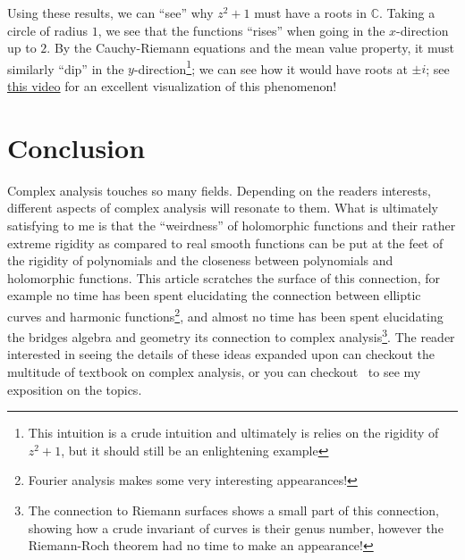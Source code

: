 \documentclass[oneside]{article}
\newcommand{\C}{\mathbb{C}}
\begin{document}
Using these results, we can ``see'' why $z^2+1$ must have a roots in $\C$. Taking a circle of radius
$1$, we see that the functions ``rises'' when going in the $x$-direction up to $2$. By the Cauchy-Riemann
equations and the mean value property, it must similarly ``dip'' in the $y$-direction\footnote{This intuition
  is a crude intuition and ultimately is relies on the rigidity of $z^2+1$, but it should still be an
enlightening example}; we can see how it would have roots at $\pm i$; see
\href{https://www.youtube.com/watch?v=T647CGsuOVU}{this video} for an excellent visualization of this
phenomenon!


\section{Conclusion}

Complex analysis touches so many fields. Depending on the readers interests, different aspects of complex
analysis will resonate to them. What is ultimately satisfying to me is that the ``weirdness'' of holomorphic
functions and their rather extreme rigidity as compared to real smooth functions can be put at the feet of the
rigidity of polynomials and the closeness between polynomials and holomorphic functions. This article
scratches the surface of this connection, for example no time has been spent elucidating the connection
between elliptic curves and harmonic functions\footnote{Fourier analysis makes some very interesting
appearances!}, and almost no time has been spent elucidating the bridges
algebra and geometry its connection to complex analysis\footnote{The connection to Riemann surfaces shows a
  small part of this connection, showing how a crude invariant of curves is their genus number, however the
Riemann-Roch theorem had no time to make an appearance!}. The reader interested in seeing the details of these
ideas expanded upon can checkout the multitude of textbook on complex analysis, or you can
checkout~\cite{NateComplexAnalysis} to see my exposition on the topics.



\printbibliography
\end{document}

